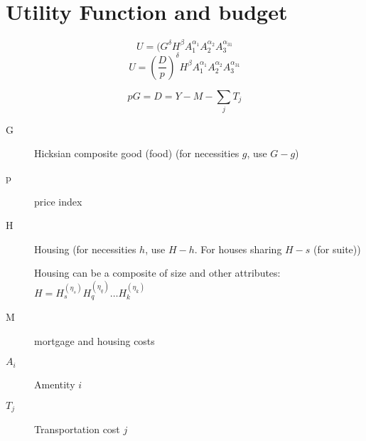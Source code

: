 \chapter{Utility Function and budget}

\[ U=(G^\delta H^\beta  A_1^{\alpha_1}  A_2^{\alpha_2}A_3^{\alpha_31}\]
\[ U=(\frac{D}{p})^\delta H^\beta  A_1^{\alpha_1}  A_2^{\alpha_2}A_3^{\alpha_31}\]

\[pG=D=Y-M-\sum_jT_j\]

\begin{description}
\item[G]Hicksian composite good  (food) (for necessities $g$, use $G-g$)
\item[p]price index
\item[H]Housing  (for necessities $h$, use $H-h$. For houses sharing $H-s$ (for suite))

Housing can be a composite of size and other attributes: $H=H_s^(\eta_s) H_q^(\eta_q)\dots H_k^(\eta_k)$
\item[M] mortgage and housing costs 
\item[$A_i$] Amentity $i$
\item[$T_j$]Transportation cost $j$


\end{description}
